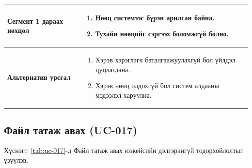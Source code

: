 \begin{table}[H]
\begin{tabular}{|p{3.8cm}|p{10.2cm}|}
        \\ \hline
        \textbf{Сегмент 1 дараах нөхцөл} &
        \begin{enumerate}
            \item Нөөц системээс бүрэн арилсан байна.
            \item Тухайн нөөцийг сэргээх боломжгүй болно.
        \end{enumerate}
        \\ \hline
        \textbf{Альтернатив урсгал} &
        \begin{enumerate}
            \item Хэрэв хэрэглэгч баталгаажуулахгүй бол үйлдэл цуцлагдана.
            \item Хэрэв нөөц олдохгүй бол систем алдааны мэдээлэл харуулна.
        \end{enumerate}
        \\ \hline
    \end{tabular}
\end{table}

\subsection{Файл татаж авах (UC-017)}

Хүснэгт~\ref{tab:uc-017}-д Файл татаж авах юзкейсийн дэлгэрэнгүй тодорхойлолтыг үзүүлэв.

